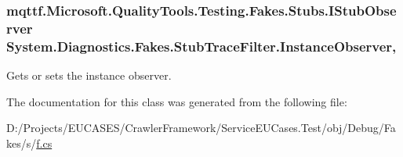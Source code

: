 \hypertarget{class_system_1_1_diagnostics_1_1_fakes_1_1_stub_trace_filter_a4bb6f09ab2b2f28d292cf19f90c31c90}{
\subsubsection[{Instance\-Observer}]{\setlength{\rightskip}{0pt plus 5cm}mqttf.\-Microsoft.\-Quality\-Tools.\-Testing.\-Fakes.\-Stubs.\-I\-Stub\-Observer System.\-Diagnostics.\-Fakes.\-Stub\-Trace\-Filter.\-Instance\-Observer\hspace{0.3cm}{\ttfamily [get]}, {\ttfamily [set]}}}\label{class_system_1_1_diagnostics_1_1_fakes_1_1_stub_trace_filter_a4bb6f09ab2b2f28d292cf19f90c31c90}


Gets or sets the instance observer.



The documentation for this class was generated from the following file\-:\begin{DoxyCompactItemize}
\item 
D\-:/\-Projects/\-E\-U\-C\-A\-S\-E\-S/\-Crawler\-Framework/\-Service\-E\-U\-Cases.\-Test/obj/\-Debug/\-Fakes/s/\hyperlink{s_2f_8cs}{f.\-cs}\end{DoxyCompactItemize}
